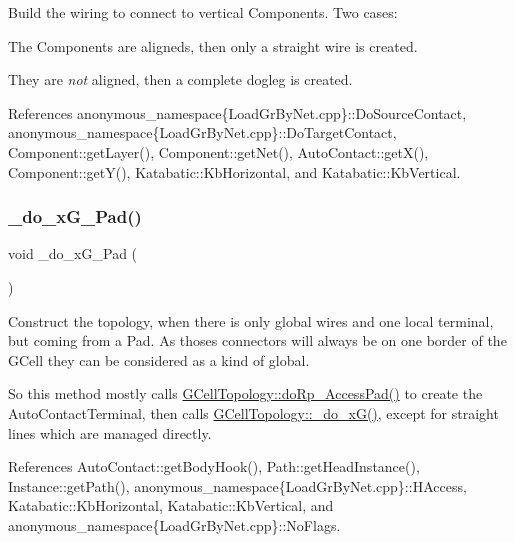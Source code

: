 Build the wiring to connect to vertical Components. Two cases\+:
\begin{DoxyItemize}
\item The Components are aligneds, then only a straight wire is created.
\item They are {\itshape not} aligned, then a complete dogleg is created.
\end{DoxyItemize}

 

References anonymous\+\_\+namespace\{\+Load\+Gr\+By\+Net.\+cpp\}\+::\+Do\+Source\+Contact, anonymous\+\_\+namespace\{\+Load\+Gr\+By\+Net.\+cpp\}\+::\+Do\+Target\+Contact, Component\+::get\+Layer(), Component\+::get\+Net(), Auto\+Contact\+::get\+X(), Component\+::get\+Y(), Katabatic\+::\+Kb\+Horizontal, and Katabatic\+::\+Kb\+Vertical.

\mbox{\label{group__LoadGlobalRouting_gabe00ab10a0dab8a3d2de0709e61e4e7d}} 
\subsubsection{\texorpdfstring{\+\_\+do\+\_\+x\+G\+\_\+Pad()}{\_do\_xG\_1Pad()}}
{\footnotesize\ttfamily void \+\_\+do\+\_\+x\+G\+\_\+Pad (\begin{DoxyParamCaption}{ }\end{DoxyParamCaption})\hspace{0.3cm}{\ttfamily [private]}}

Construct the topology, when there is only global wires and one local terminal, but coming from a Pad. As thoses connectors will always be on one border of the G\+Cell they can be considered as a kind of global.

So this method mostly calls \hyperlink{group__LoadGlobalRouting_ga60edeea78b56db072fc26a58a7afbcd4}{G\+Cell\+Topology\+::do\+Rp\+\_\+\+Access\+Pad()} to create the Auto\+Contact\+Terminal, then calls \hyperlink{group__LoadGlobalRouting_gaaa6d4ccd2eadfb6bc3e2cc98cfaf2cca}{G\+Cell\+Topology\+::\+\_\+do\+\_\+x\+G()}, except for straight lines which are managed directly. 

References Auto\+Contact\+::get\+Body\+Hook(), Path\+::get\+Head\+Instance(), Instance\+::get\+Path(), anonymous\+\_\+namespace\{\+Load\+Gr\+By\+Net.\+cpp\}\+::\+H\+Access, Katabatic\+::\+Kb\+Horizontal, Katabatic\+::\+Kb\+Vertical, and anonymous\+\_\+namespace\{\+Load\+Gr\+By\+Net.\+cpp\}\+::\+No\+Flags.

